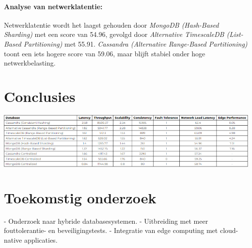 \documentclass[a0,portrait]{hogent-poster}
\begin{document}
\begin{multicols}{2}
\paragraph{Analyse van netwerklatentie:}
Netwerklatentie wordt het laagst gehouden door \textit{MongoDB (Hash-Based Sharding)} met een score van 54.96, gevolgd door \textit{Alternative TimescaleDB (List-Based Partitioning)} met 55.91. \textit{Cassandra (Alternative Range-Based Partitioning)} toont een iets hogere score van 59.06, maar blijft stabiel onder hoge netwerkbelasting.

\section{Conclusies}

\begin{center}
	\captionsetup{type=figure}
	\includegraphics[width=1.0\linewidth]{Resultaten.png}
  \end{center}

\section{Toekomstig onderzoek}

- Onderzoek naar hybride databasesystemen.
- Uitbreiding met meer fouttolerantie- en beveiligingstests.
- Integratie van edge computing met cloud-native applicaties.

\end{multicols}
\end{document}

